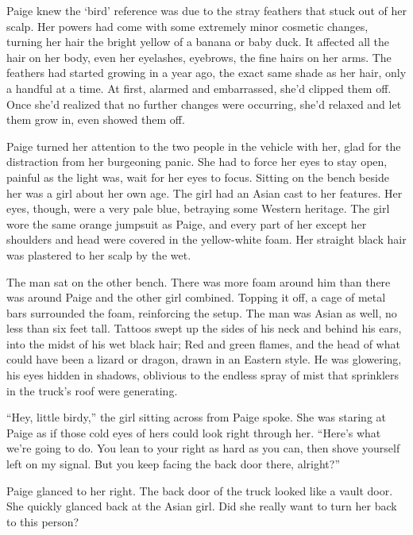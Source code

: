 Paige knew the `bird' reference was due to the stray feathers that stuck out of her scalp.  Her powers had come with some extremely minor cosmetic changes, turning her hair the bright yellow of a banana or baby duck.  It affected all the hair on her body, even her eyelashes, eyebrows, the fine hairs on her arms.  The feathers had started growing in a year ago, the exact same shade as her hair, only a handful at a time.  At first, alarmed and embarrassed, she'd clipped them off.  Once she'd realized that no further changes were occurring, she'd relaxed and let them grow in, even showed them off.



Paige turned her attention to the two people in the vehicle with her, glad for the distraction from her burgeoning panic.  She had to force her eyes to stay open, painful as the light was, wait for her eyes to focus.  Sitting on the bench beside her was a girl about her own age.  The girl had an Asian cast to her features.  Her eyes, though, were a very pale blue, betraying some Western heritage.  The girl wore the same orange jumpsuit as Paige, and every part of her except her shoulders and head were covered in the yellow-white foam.  Her straight black hair was plastered to her scalp by the wet.



The man sat on the other bench.  There was more foam around him than there was around Paige and the other girl combined.  Topping it off, a cage of metal bars surrounded the foam, reinforcing the setup.  The man was Asian as well, no less than six feet tall.  Tattoos swept up the sides of his neck and behind his ears, into the midst of his wet black hair; Red and green flames, and the head of what could have been a lizard or dragon, drawn in an Eastern style.  He was glowering, his eyes hidden in shadows, oblivious to the endless spray of mist that sprinklers in the truck's roof were generating.



``Hey, little birdy,'' the girl sitting across from Paige spoke.  She was staring at Paige as if those cold eyes of hers could look right through her.  ``Here's what we're going to do.  You lean to your right as hard as you can, then shove yourself left on my signal.  But you keep facing the back door there, alright?''



Paige glanced to her right.  The back door of the truck looked like a vault door.  She quickly glanced back at the Asian girl.  Did she really want to turn her back to this person?



